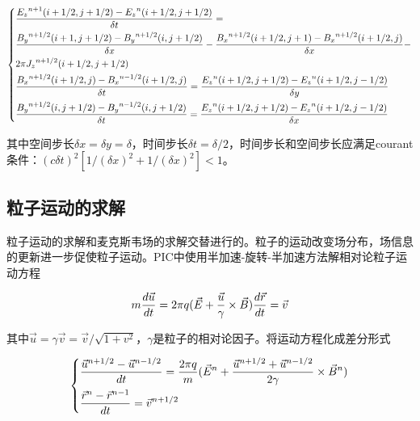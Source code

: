 \begin{equation}
\label{eqn:maxwell_TE}
\begin{dcases*}
\frac{ {E_z}^{n+1}(i+1/2,j+1/2)-{E_z}^{n}(i+1/2,j+1/2)}{\delta t} =   \\
\frac{ {B_y}^{n+1/2}(i+1,j+1/2)-{B_y}^{n+1/2}(i,j+1/2)}{\delta x}-\frac{ {B_x}^{n+1/2}(i+1/2,j+1)-{B_x}^{n+1/2}(i+1/2,j)}{\delta x}-   \\
2 \pi {J_z}^{n+1/2}(i+1/2,j+1/2)    \\
\frac{ {B_x}^{n+1/2}(i+1/2,j)-{B_x}^{n-1/2}(i+1/2,j)}{\delta t} = \frac{ {E_z}^{n}(i+1/2,j+1/2)-{E_z}^{n}(i+1/2,j-1/2)}{\delta y}  \\
\frac{ {B_y}^{n+1/2}(i,j+1/2)-{B_y}^{n-1/2}(i,j+1/2)}{\delta t} = \frac{ {E_z}^{n}(i+1/2,j+1/2)-{E_z}^{n}(i+1/2,j-1/2)}{\delta x}
\end{dcases*}
\end{equation} 




其中空间步长$\delta x=\delta y=\delta$，时间步长$\delta t= \delta /2$，时间步长和空间步长应满足courant
条件：$(c \delta t)^2 [1/(\delta x)^2 + 1/(\delta x)^2] < 1$。


\subsection{粒子运动的求解}

粒子运动的求解和麦克斯韦场的求解交替进行的。粒子的运动改变场分布，场信息的更新进一步促使粒子运动。PIC中使用半加速-旋转-半加速方法\cite{boris1970relativistic}解相对论粒子运动方程
   
\begin{equation}
\label{eqn:PIC_motion}
m \frac{d \vec{u}}{dt}=2 \pi q (\vec{E} + \frac{\vec{u}}{\gamma} \times \vec{B}) \\
\frac{d \vec{r}}{dt}= \vec{v}
\end{equation} 


其中$\vec{u}=\gamma \vec{v} = \vec{v}/\sqrt{1+ {{v}}^2}$，$\gamma$是粒子的相对论因子。将运动方程化成差分形式


\begin{equation}
\label{eqn:PIC_motion_derivative}
\begin{dcases*}
\frac{\vec{u}^{n+1/2}-\vec{u}^{n-1/2}}{dt}=\frac{2 \pi q }{m} (\vec{E}^n + \frac{\vec{u}^{n+1/2}+\vec{u}^{n-1/2}}{2\gamma} \times \vec{B}^n)  \\
\frac{\vec{r}^{n}-\vec{r}^{n-1}}{dt}= \vec{v}^{n+1/2}
\end{dcases*}
\end{equation} 


